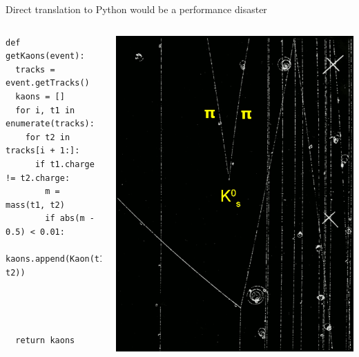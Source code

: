 \documentclass[aspectratio=169]{beamer}
\begin{document}
\begin{frame}[fragile]{Direct translation to Python would be a performance disaster}
\vspace{0.25 cm}
\begin{columns}[b]
\begin{verbatim}
def getKaons(event):
  tracks = event.getTracks()
  kaons = []
  for i, t1 in enumerate(tracks):
    for t2 in tracks[i + 1:]:
      if t1.charge != t2.charge:
        m = mass(t1, t2)
        if abs(m - 0.5) < 0.01:
          kaons.append(Kaon(t1, t2))




  return kaons

\end{verbatim}

\vspace{0.1 cm}

\includegraphics[width=\linewidth]{kshort-1.png}
\end{columns}
\end{frame}
\end{document}
